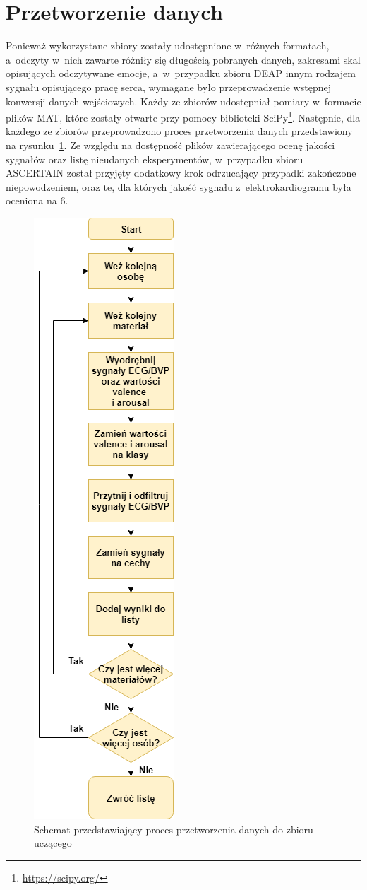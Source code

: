 \section{Przetworzenie danych}
Ponieważ wykorzystane zbiory zostały udostępnione w~różnych formatach, a~odczyty w~nich zawarte różniły się długością pobranych danych, zakresami skal opisujących odczytywane emocje, a~w~przypadku zbioru DEAP innym rodzajem sygnału opisującego pracę serca, wymagane było przeprowadzenie wstępnej konwersji danych wejściowych. Każdy ze zbiorów udostępniał pomiary w~formacie plików MAT, które zostały otwarte przy pomocy biblioteki SciPy\footnote{\url{https://scipy.org/}}. Następnie, dla każdego ze zbiorów przeprowadzono proces przetworzenia danych przedstawiony na rysunku~\ref{fig:preprocessing_flow}. Ze względu na dostępność plików zawierającego ocenę jakości sygnałów oraz listę nieudanych eksperymentów, w~przypadku zbioru ASCERTAIN został przyjęty dodatkowy krok odrzucający przypadki zakończone niepowodzeniem, oraz te, dla których jakość sygnału z~elektrokardiogramu była oceniona na 6.
\begin{figure}[!t]
	\centering
	\includegraphics[width=0.25\linewidth]{images/preprocessing_flow.png}
	\caption{Schemat przedstawiający proces przetworzenia danych do zbioru uczącego}
	\label{fig:preprocessing_flow}
\end{figure}

